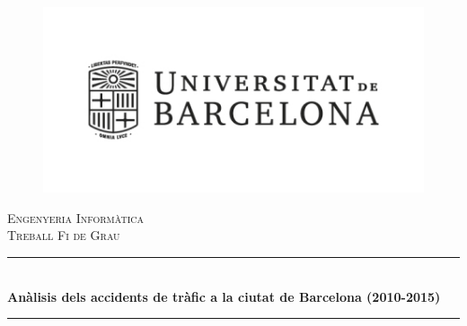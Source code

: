 \begin{titlepage}

\newcommand{\HRule}{\rule{\linewidth}{0.5mm}} %

\center %
 
\begin{figure}[H]
\centering
\includegraphics[scale=0.7]{logo-universitat.jpg}
\end{figure}

\textsc{\large Engenyeria Informàtica}\\[0.5cm] %
\textsc{\LARGE Treball Fi  de Grau}\\[0.5cm] %


\HRule \\[0.4cm]
{ \huge \bfseries  Anàlisis dels accidents de tràfic a la ciutat de Barcelona (2010-2015)}\\[0.4cm] %
\HRule \\[1.5cm]
 

\begin{multicols}{2}


\end{multicols}
\end{titlepage}
